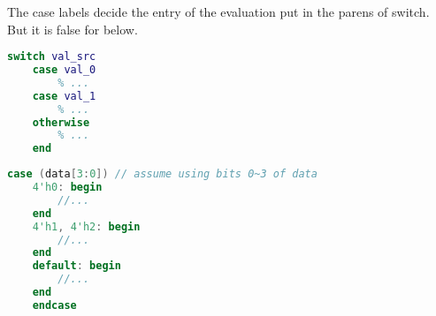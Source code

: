 
The case labels decide the entry of the evaluation put in the parens of switch. But it is false for below.

\begin{lstlisting}[language=MATLAB]
	switch val_src
	case val_0
		% ...
	case val_1
		% ...
	otherwise
		% ...
	end
\end{lstlisting}


\begin{lstlisting}[language=Verilog]
	case (data[3:0]) // assume using bits 0~3 of data
	4'h0: begin
		//...
	end
	4'h1, 4'h2: begin
		//...
	end
	default: begin
		//...
	end
	endcase
\end{lstlisting}



